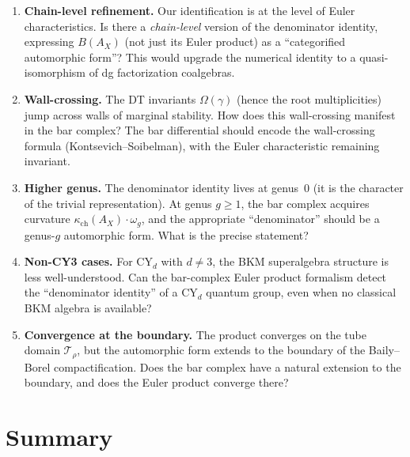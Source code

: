\documentclass[11pt]{article}
\theoremstyle{definition}
\theoremstyle{remark}
\begin{document}
\begin{enumerate}[label=(O\arabic*)]
\item \textbf{Chain-level refinement.} Our identification is at the
 level of Euler characteristics. Is there a \emph{chain-level} version
 of the denominator identity, expressing $B(A_X)$ (not just its Euler
 product) as a ``categorified automorphic form''? This would upgrade
 the numerical identity to a quasi-isomorphism of dg factorization
 coalgebras.

\item \textbf{Wall-crossing.} The DT invariants $\Omega(\gamma)$
 (hence the root multiplicities) jump across walls of marginal stability.
 How does this wall-crossing manifest in the bar complex? The bar
 differential should encode the wall-crossing formula (Kontsevich--Soibelman),
 with the Euler characteristic remaining invariant.

\item \textbf{Higher genus.} The denominator identity lives at genus~0
 (it is the character of the trivial representation). At genus $g \geq 1$,
 the bar complex acquires curvature $\kappa_{\mathrm{ch}}(A_X) \cdot \omega_g$, and the
 appropriate ``denominator'' should be a genus-$g$ automorphic form.
 What is the precise statement?

\item \textbf{Non-CY3 cases.} For CY$_d$ with $d \neq 3$, the BKM
 superalgebra structure is less well-understood. Can the bar-complex
 Euler product formalism detect the ``denominator identity'' of a
 CY$_d$ quantum group, even when no classical BKM algebra is available?

\item \textbf{Convergence at the boundary.} The product converges on
 the tube domain $\mathcal{T}_\rho$, but the automorphic form extends
 to the boundary of the Baily--Borel compactification. Does the
 bar complex have a natural extension to the boundary, and does the
 Euler product converge there?
\end{enumerate}


\section{Summary}
\label{sec:summary}
\end{document}
